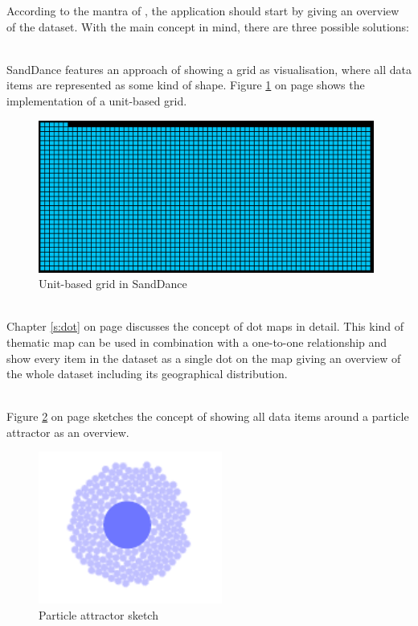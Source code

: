 According to the mantra of \citeauthor{Shneiderman1996}, the application should start by giving an overview of the dataset. With the main concept in mind, there are three possible solutions:
\begin{enumerate}

 \hfill \\
SandDance features an approach of showing a grid as visualisation, where all data items are represented as some kind of shape. Figure \ref{fig:sanddance-grid} on page \pageref{fig:sanddance-grid} shows the implementation of a unit-based grid.

\begin{figure}[!htb]
\centering
\includegraphics[height=5cm]{images/methods/related/sanddance-grid.png}
\caption[
    Unit-based grid in SandDance.
]{Unit-based grid in SandDance}
\label{fig:sanddance-grid}
\end{figure}

 \hfill \\
Chapter \ref{s:dot} on page \pageref{s:dot} discusses the concept of dot maps in detail. This kind of thematic map can be used in combination with a one-to-one relationship and show every item in the dataset as a single dot on the map giving an overview of the whole dataset including its geographical distribution.

 \hfill \\
Figure \ref{fig:particle-attractor} on page \pageref{fig:particle-attractor} sketches the concept of showing all data items around a particle attractor as an overview.

\begin{figure}[!htb]
\centering
\includegraphics[height=5cm]{images/methods/related/particle-attractor.png}
\caption[
    Particle attractor sketch.
]{Particle attractor sketch}
\label{fig:particle-attractor}
\end{figure}

\end{enumerate}

